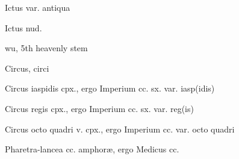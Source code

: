  {\mktsStyleItalic{}Ictus\/} var. {\mktsStyleItalic{}antiqua\/}


 {\mktsStyleItalic{}Ictus nud.\/}












 wu, 5th heavenly stem


 {\mktsStyleItalic{}Circus\/}, circi


 {} {\mktsStyleItalic{}Circus iaspidis cpx.\/}, ergo {\mktsStyleItalic{}Imperium cc. sx.\/} var. {\mktsStyleItalic{}iasp(idis)\/}


 {} {\mktsStyleItalic{}Circus regis cpx.\/}, ergo {\mktsStyleItalic{}Imperium cc. sx.\/} var. {\mktsStyleItalic{}reg(is)\/}


 {} {\mktsStyleItalic{}Circus octo quadri v. cpx.\/}, ergo {\mktsStyleItalic{}Imperium cc.\/} var. {\mktsStyleItalic{}octo quadri\/}


 {} {\mktsStyleItalic{}Pharetra-lancea cc. amphoræ\/}, ergo {\mktsStyleItalic{}Medicus cc.\/}


